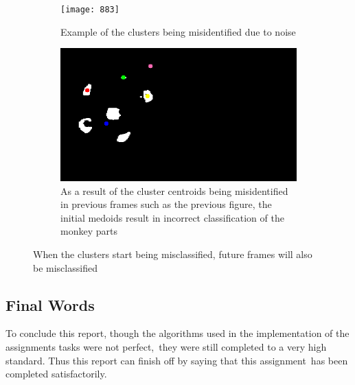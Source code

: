\documentclass[12pt,a4paper]{article}
\begin{document}
      \begin{figure}[H]
        \centering
        \begin{subfigure}[H]{0.49\textwidth}
          \texttt{[image: 883]}
          \caption{Example of the clusters being misidentified due to noise}
        \end{subfigure}
        \begin{subfigure}[H]{0.49\textwidth}
          \includegraphics[width=\linewidth]{952}
          \caption{As a result of the cluster centroids being misidentified in previous frames such as the previous figure, the initial medoids result in incorrect classification of the monkey parts}
        \end{subfigure}
      \caption{When the clusters start being misclassified, future frames will also be misclassified}
      \end{figure}

      \subsection{Final Words}

      To conclude this report, though the algorithms used in the implementation of the assignments tasks were not perfect,\
      they were still completed to a very high standard. Thus this report can finish off by saying that this assignment\
      has been completed satisfactorily.

    \listoffigures
\end{document}
